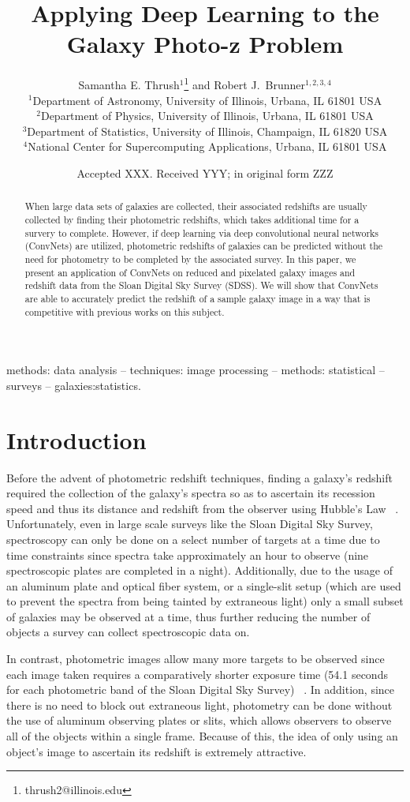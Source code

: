 \documentclass[fleqn,usenatbib]{mnras}
\title[Dreaming of Photo-z's]{Applying Deep Learning to the Galaxy Photo-z Problem}
\author[S. E. Thrush and R. J. Brunner]{
  Samantha E. Thrush$^1$\thanks{thrush2@illinois.edu} and Robert J.~Brunner$^{1,2,3,4}$ \\
$^1$Department of Astronomy, University of Illinois, Urbana, IL 61801 USA\\
$^2$Department of Physics, University of Illinois, Urbana, IL 61801 USA\\
$^3$Department of Statistics, University of Illinois, Champaign, IL 61820 USA\\
$^4$National Center for Supercomputing Applications, Urbana, IL 61801 USA
}
\date{Accepted XXX. Received YYY; in original form ZZZ}
\begin{document}
\label{firstpage}
\pagerange{\pageref{firstpage}--\pageref{lastpage}}
\maketitle

\begin{abstract}
When large data sets of galaxies are collected, their associated redshifts are usually collected by finding their photometric redshifts, which takes additional time for a survery to complete.  However, if deep learning via deep convolutional neural networks (ConvNets) are utilized, photometric redshifts of galaxies can be predicted without the need for photometry to be completed by the associated survey. In this paper, we present an application of ConvNets on reduced and pixelated galaxy images and redshift data from the Sloan Digital Sky Survey (SDSS).  We will show that ConvNets are able to accurately predict the redshift of a sample galaxy image in a way that is competitive with previous works on this subject.
\end{abstract}

\begin{keywords}
methods: data analysis -- techniques: image processing -- methods: statistical
-- surveys -- galaxies:statistics.
\end{keywords}

\section{Introduction}
  \label{sec:introduction}
Before the advent of photometric redshift techniques, finding a galaxy's redshift required the collection of the galaxy's spectra so as to ascertain its recession speed and thus its distance and redshift from the observer using Hubble's Law ~\citep{hubble_relation_1929}. Unfortunately, even in large scale surveys like the Sloan Digital Sky Survey, spectroscopy can only be done on a select number of targets at a time due to time constraints since spectra take approximately an hour to observe (nine spectroscopic plates are completed in a night).  Additionally, due to the usage of an aluminum plate and optical fiber system, or a single-slit setup (which are used to prevent the spectra from being tainted by extraneous light) only a small subset of galaxies may be observed at a time, thus further reducing the number of objects a survey can collect spectroscopic data on.

In contrast, photometric images allow many more targets to be observed since each image taken requires a comparatively shorter exposure time (54.1 seconds for each photometric band of the Sloan Digital Sky Survey) ~\citep{york_sloan_2000}.  In addition, since there is no need to block out extraneous light, photometry can be done without the use of aluminum observing plates or slits, which allows observers to observe all of the objects within a single frame.  Because of this, the idea of only using an object's image to ascertain its redshift is extremely attractive.
\end{document}
